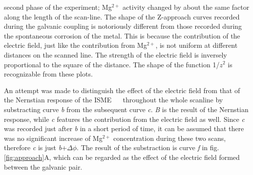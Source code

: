 \documentclass[3p]{elsarticle}
\providecommand{\DIFadd}[1]{{\protect\color{blue}#1}} %
\providecommand{\DIFaddbegin}{} %
\begin{document}
second phase of the experiment; Mg$^{2+}$ activity changed by about the same factor along the length of the scan-line. The shape of the Z-approach curves recorded during the galvanic coupling is notoriously different from those recorded during the spontaneous corrosion of the metal. This is because the contribution of the electric field, just like the contribution from Mg$^{2+}$, is not uniform at different distances on the scanned line. The strength of the electric field is inversely proportional to the square of the distance. The shape of the function 1/$z^2$ is recognizable from these plots.

\DIFaddbegin \DIFadd{An attempt was made to distinguish the effect of the electric field from that of the Nernstian response of the ISME \mbox{%
\cite{reviewer2} }%
throughout the whole scanline by substracting curve }\emph{\DIFadd{b}} \DIFadd{from the subsequent curve }\emph{\DIFadd{c}}\DIFadd{. }\emph{\DIFadd{B}} \DIFadd{is the result of the Nernstian response, while }\emph{\DIFadd{c}} \DIFadd{features the contribution from the electric field as well. Since }\emph{\DIFadd{c}} \DIFadd{was recorded just after }\emph{\DIFadd{b}} \DIFadd{in a short period of time, it can be assumed that there was no significant increase of Mg$^{2+}$ concentration during these two scans, therefore }\emph{\DIFadd{c}} \DIFadd{is just }\emph{\DIFadd{b}}\DIFadd{+$\Delta \phi$. The result of the substraction is curve }\emph{\DIFadd{f}} \DIFadd{in fig. \ref{fig:approach}A, which can be regarded as the effect of the electric field formed between the galvanic pair.
}
\end{document}
